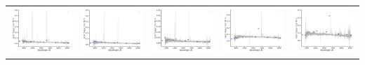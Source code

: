 \begin{center}
\begin{longtable}{l l l l l }
    \includegraphics[width=0.2\linewidth, clip]{Figs/Figs-sdss/spec-1512-53742-0351-STRIPE82-0061-059714.pdf} & \includegraphics[width=0.2\linewidth, clip]{Figs/Figs-sdss/spec-1512-53742-0430-STRIPE82-0064-022463.pdf} & \includegraphics[width=0.2\linewidth, clip]{Figs/Figs-sdss/spec-1512-53742-0471-STRIPE82-0064-008459.pdf} & \includegraphics[width=0.2\linewidth, clip]{Figs/Figs-sdss/spec-1558-53271-0059-STRIPE82-0053-022298.pdf} & \includegraphics[width=0.2\linewidth, clip]{Figs/Figs-sdss/spec-1829-53494-0276-SPLUS-n05n53-037456.pdf} \\

\end{longtable}
\end{center}
